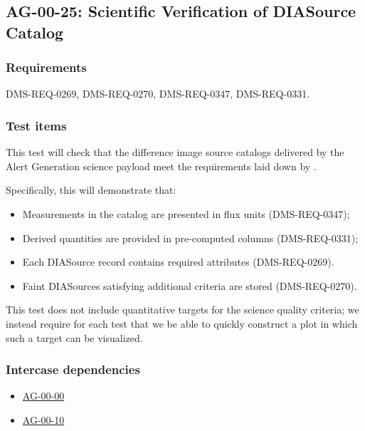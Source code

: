 \subsection{AG-00-25: Scientific Verification of DIASource Catalog}
\label{ag-00-25}

\subsubsection{Requirements}

DMS-REQ-0269, DMS-REQ-0270, DMS-REQ-0347, DMS-REQ-0331.

\subsubsection{Test items}
\label{ag-00-25-items}

This test will check that the difference image source catalogs 
delivered by the Alert Generation science
payload meet the requirements laid down by .

Specifically, this will demonstrate that:

\begin{itemize}

  \item{Measurements in the catalog are presented in flux units (DMS-REQ-0347);} 
  \item{Derived quantities are provided in pre-computed columns (DMS-REQ-0331);} 
\item{Each DIASource record contains required attributes
	(DMS-REQ-0269).}

\item{Faint DIASources satisfying additional criteria are stored
	(DMS-REQ-0270).}

\end{itemize}

This test does not include quantitative targets for the science quality criteria; we instead require for each test that we be able to quickly construct a plot in which such a target can be visualized.

\subsubsection{Intercase dependencies}

\begin{itemize}

  \item{\hyperref[ag-00-00]{AG-00-00}}
  \item{\hyperref[ag-00-10]{AG-00-10}}

\end{itemize}

